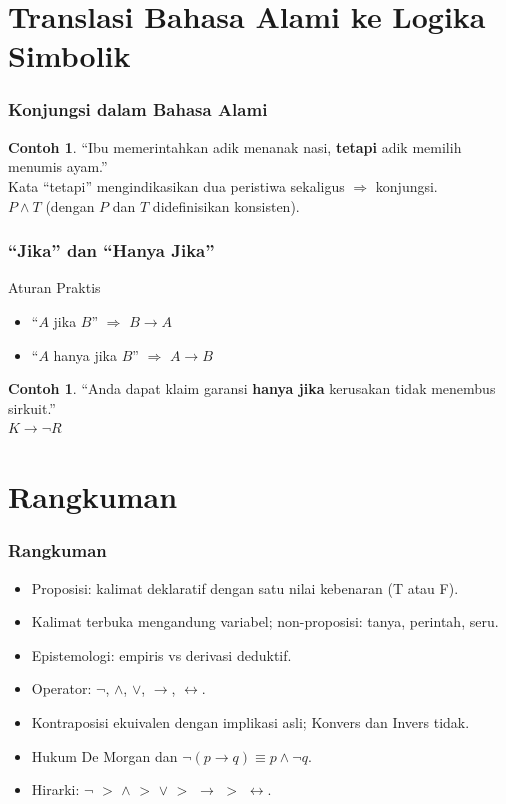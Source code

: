 \documentclass[handout]{beamer}
\theoremstyle{definition}
\theoremstyle{example}
\newtheorem{contoh}[theorem]{Contoh}
\begin{document}
\section{Translasi Bahasa Alami ke Logika Simbolik}

\begin{frame}
\frametitle{Konjungsi dalam Bahasa Alami}
\begin{contoh}
``Ibu memerintahkan adik menanak nasi, \textbf{tetapi} adik memilih menumis ayam.''\\
Kata ``tetapi'' mengindikasikan dua peristiwa sekaligus $\Rightarrow$ konjungsi.\\
$P \wedge T$ (dengan $P$ dan $T$ didefinisikan konsisten).
\end{contoh}
\end{frame}

\begin{frame}
\frametitle{``Jika'' dan ``Hanya Jika''}
\begin{block}{Aturan Praktis}
\begin{itemize}
  \item ``$A$ jika $B$'' $\Rightarrow$ $B \rightarrow A$
  \item ``$A$ hanya jika $B$'' $\Rightarrow$ $A \rightarrow B$
\end{itemize}
\end{block}
\begin{contoh}
``Anda dapat klaim garansi \textbf{hanya jika} kerusakan tidak menembus sirkuit.''\\
$K \rightarrow \neg R$
\end{contoh}
\end{frame}

\section{Rangkuman}

\begin{frame}
\frametitle{Rangkuman}
\begin{itemize}
  \item Proposisi: kalimat deklaratif dengan satu nilai kebenaran (T atau F).
  \item Kalimat terbuka mengandung variabel; non-proposisi: tanya, perintah, seru.
  \item Epistemologi: empiris vs derivasi deduktif.
  \item Operator: $\neg$, $\wedge$, $\vee$, $\rightarrow$, $\leftrightarrow$.
  \item Kontraposisi ekuivalen dengan implikasi asli; Konvers dan Invers tidak.
  \item Hukum De Morgan dan $\neg(p \rightarrow q) \equiv p \wedge \neg q$.
  \item Hirarki: $\neg$ $>$ $\wedge$ $>$ $\vee$ $>$ $\rightarrow$ $>$ $\leftrightarrow$.
\end{itemize}
\end{frame}
\end{document}
